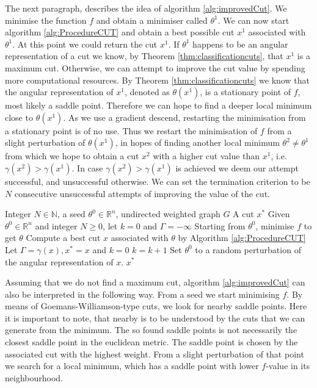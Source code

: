 \documentclass[12pt,a4paper]{article}
\theoremstyle{mythm}
\begin{document}
The next paragraph, describes the idea of algorithm \ref{alg:improvedCut}.
We minimise the function $ f $ and obtain a minimiser called $ \theta^1 $. 
We can now start algorithm \ref{alg:ProcedureCUT} and obtain a best possible cut $ x^1 $ associated with $ \theta^1 $.
At this point we could return the cut $ x^1 $.
If $ \theta^1 $ happens to be an angular representation of a cut we know, by Theorem \ref{thm:classificationcuts}, that $ x^1 $ is a maximum cut.
Otherwise, we can attempt to improve the cut value by spending more computational resources. 
By Theorem \ref{thm:classificationcuts} we know that the angular representation of $ x^1 $, denoted as $ \theta ( x^1)  $, is a stationary point of $ f $, most likely a
saddle point. 
Therefore we can hope to find a deeper local minimum close to $ \theta ( x^1) $.
As we use a gradient descend, restarting the minimisation from a stationary point is of no use.
Thus we restart the minimisation of $ f $ from a slight perturbation of $ \theta (x^1) $, in hopes of finding another local minimum $ \theta^2 \neq \theta^1  $ from which we
hope to obtain a cut $ x^2 $ with a higher cut value than $ x^1 $, i.e. $ \gamma (x^2) > \gamma (x^1)  $.
In case $ \gamma (x^2) > \gamma (x^1) $ is achieved we deem our attempt successful, and unsuccessful otherwise.
We can set the termination criterion to be $ N $ consecutive unsuccessful attempts of improving the value of the cut.
\begin{algorithm}
\caption{\ImprovedCut}
\label{alg:improvedCut} 
\begin{algorithmic}[1]
\Require Integer $ N \in \mathbb{N}  $, a seed $ \theta^0 \in \mathbb{R} ^{ n }  $, undirected weighted graph $ G $
\Ensure A cut $ x^* $
\State Given $ \theta^0 \in \mathbb{R} ^{ n }  $ and integer $ N \geq 0  $, let $ k=0 $ and $ \Gamma = - \infty  $
\State Starting from $ \theta^0 $, minimise $ f $ to get $ \theta  $
\State Compute a best cut $ x $ associated with $ \theta $ by Algorithm \ref{alg:ProcedureCUT} 
\State Let $ \Gamma = \gamma (x), x^* = x $ and $ k=0 $
\Else
\State $ k = k+1 $
\EndIf
\State Set $ \theta^0 $ to a random perturbation of the angular representation of $ x $.
\EndWhile
\State \Return $ x ^{ * }  $
\EndProcedure
\end{algorithmic}
\end{algorithm}

Assuming that we do not find a maximum cut, algorithm \ref{alg:improvedCut} can also be interpreted in the following way.
From a seed we start minimising $ f $. By means of Goemans-Williamson-type cuts, we look for nearby saddle points. 
Here it is important to note, that nearby is to be understood by the cuts that we can generate from the minimum. The so found saddle points is not necessarily
the closest saddle point in the euclidean metric.
The saddle point is chosen by the associated cut with the highest weight.
From a slight perturbation of that point we search for a local minimum, which has a saddle point with lower $ f $-value in its neighbourhood.
\end{document}
